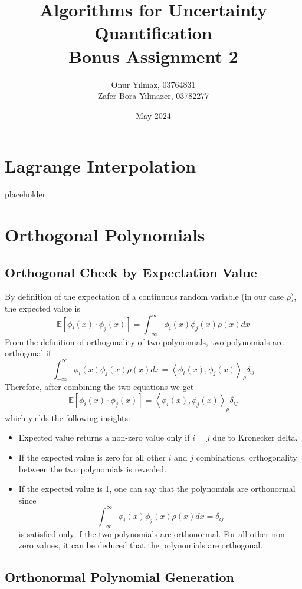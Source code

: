 \documentclass{article}
\title{Algorithms for Uncertainty Quantification\\
Bonus Assignment 2}
\author{Onur Yılmaz, 03764831 \\Zafer Bora Yılmazer, 03782277 }
\date{May 2024}
\begin{document}
\maketitle

\section{Lagrange Interpolation}
placeholder

\section{Orthogonal Polynomials}
\subsection{Orthogonal Check by Expectation Value}
By definition of the expectation of a continuous random variable (in our case $\rho$), the expected value is 
\begin{equation}
    \mathbb{E}[\phi_i(x)\cdot\phi_j(x)] = \int_{-\infty}^\infty\phi_i(x)\phi_j(x)\rho(x)dx
\end{equation}
From the definition of orthogonality of two polynomials, two polynomials are orthogonal if 
\begin{equation}
    \int_{-\infty}^\infty\phi_i(x)\phi_j(x)\rho(x)dx = \left\langle\phi_i(x), \phi_j(x)\right\rangle _\rho\delta_{ij}
\end{equation}
Therefore, after combining the two equations we get 
\begin{equation}
    \mathbb{E}[\phi_i(x)\cdot\phi_j(x)] = \left\langle\phi_i(x), \phi_j(x)\right\rangle _\rho\delta_{ij}
\end{equation}
which yields the following insights:
\begin{itemize}
    \item Expected value returns a non-zero value only if $i=j$ due to Kronecker delta.
    \item If the expected value is zero for all other $i$ and $j$ combinations, orthogonality between the two 
    polynomials is revealed.
    \item If the expected value is 1, one can say that the polynomials are orthonormal since 
    \[\int_{-\infty}^\infty\phi_i(x)\phi_j(x)\rho(x)dx = \delta_{ij}\] is satisfied only if the two polynomials are 
    orthonormal. For all other non-zero values, it can be deduced that the polynomials are orthogonal.
\end{itemize}

\subsection{Orthonormal Polynomial Generation}
\end{document}
